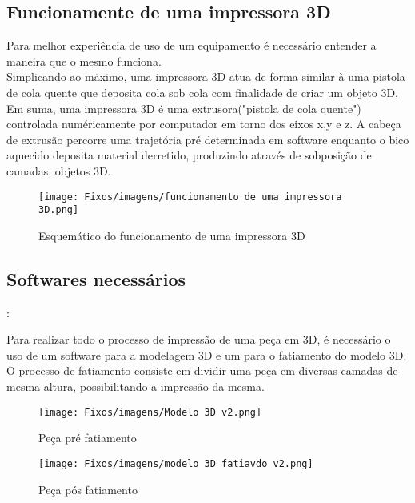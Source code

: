 \subsection{Funcionamente de uma impressora 3D}

Para melhor experiência de uso de um equipamento é necessário entender a maneira que o mesmo funciona.\\[0.3cm]

 Simplicando ao máximo, uma impressora 3D atua de forma similar à uma pistola de cola quente que deposita cola sob cola com finalidade de criar um objeto 3D.\\[0.3cm]

Em suma, uma impressora 3D é uma extrusora("pistola de cola quente") controlada numéricamente por computador em torno dos eixos x,y e z. A cabeça de extrusão percorre uma trajetória pré determinada em software enquanto o bico aquecido deposita material derretido, produzindo através de sobposição de camadas, objetos 3D.\\[0.3cm]

\begin{figure}[h!]
    \centering
    \texttt{[image: Fixos/imagens/funcionamento de uma impressora 3D.png]}
    \caption{Esquemático do funcionamento de uma impressora 3D}
    \label{fig:my_label}
\end{figure}

\subsection{Softwares necessários}:

Para realizar todo o processo de impressão de uma peça em 3D, é necessário o uso de um software para a modelagem 3D e um para o fatiamento do modelo 3D.\\[0.3cm]
O processo de fatiamento consiste em dividir uma peça em diversas camadas de mesma altura, possibilitando a impressão da mesma.\\[0.3cm]

\begin{figure}[h!]
    \centering
    \texttt{[image: Fixos/imagens/Modelo 3D v2.png]}
    \caption{Peça pré fatiamento}
    \label{fig:my_label}
\end{figure}

\begin{figure}[h!]
    \centering
    \texttt{[image: Fixos/imagens/modelo 3D fatiavdo v2.png]}
    \caption{Peça pós fatiamento}
    \label{fig:my_label}
\end{figure}


